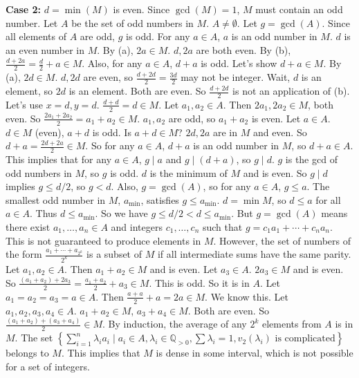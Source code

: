 \documentclass[12pt,a4paper]{article}
\theoremstyle{definition}
\begin{document}
    \textbf{Case 2:} $d = \min(M)$ is even.
    Since $\gcd(M)=1$, $M$ must contain an odd number. Let $A$ be the set of odd numbers in $M$. $A \neq \emptyset$.
    Let $g = \gcd(A)$. Since all elements of $A$ are odd, $g$ is odd.
    For any $a \in A$, $a$ is an odd number in $M$. $d$ is an even number in $M$.
    By (a), $2a \in M$. $d, 2a$ are both even.
    By (b), $\frac{d+2a}{2} = \frac{d}{2}+a \in M$.
    Also, for any $a \in A$, $d+a$ is odd. Let's show $d+a \in M$.
    By (a), $2d \in M$. $d, 2d$ are even, so $\frac{d+2d}{2} = \frac{3d}{2}$ may not be integer.
    Wait, $d$ is an element, so $2d$ is an element. Both are even. So $\frac{d+2d}{2}$ is not an application of (b).
    Let's use $x=d, y=d$. $\frac{d+d}{2}=d \in M$.
    Let $a_1, a_2 \in A$. Then $2a_1, 2a_2 \in M$, both even. So $\frac{2a_1+2a_2}{2}=a_1+a_2 \in M$.
    $a_1, a_2$ are odd, so $a_1+a_2$ is even.
    Let $a \in A$. $d \in M$ (even), $a+d$ is odd. Is $a+d \in M$?
    $2d, 2a$ are in $M$ and even. So $d+a = \frac{2d+2a}{2} \in M$.
    So for any $a \in A$, $d+a$ is an odd number in $M$, so $d+a \in A$.
    This implies that for any $a \in A$, $g \mid a$ and $g \mid (d+a)$, so $g \mid d$.
    $g$ is the gcd of odd numbers in $M$, so $g$ is odd. $d$ is the minimum of $M$ and is even.
    So $g \mid d$ implies $g \leq d/2$, so $g < d$.
    Also, $g=\gcd(A)$, so for any $a \in A$, $g \leq a$. The smallest odd number in $M$, $a_{\min}$, satisfies $g \leq a_{\min}$.
    $d=\min M$, so $d \leq a$ for all $a \in A$. Thus $d \leq a_{\min}$.
    So we have $g \leq d/2 < d \leq a_{\min}$.
    But $g=\gcd(A)$ means there exist $a_1, \ldots, a_n \in A$ and integers $c_1, \ldots, c_n$ such that $g = c_1 a_1 + \cdots + c_n a_n$. This is not guaranteed to produce elements in $M$.
    However, the set of numbers of the form $\frac{a_1+\cdots+a_{2^k}}{2^k}$ is a subset of $M$ if all intermediate sums have the same parity.
    Let $a_1, a_2 \in A$. Then $a_1+a_2 \in M$ and is even.
    Let $a_3 \in A$. $2a_3 \in M$ and is even.
    So $\frac{(a_1+a_2)+2a_3}{2} = \frac{a_1+a_2}{2}+a_3 \in M$. This is odd. So it is in $A$.
    Let $a_1=a_2=a_3=a \in A$. Then $\frac{a+a}{2}+a=2a \in M$. We know this.
    Let $a_1, a_2, a_3, a_4 \in A$. $a_1+a_2 \in M$, $a_3+a_4 \in M$. Both are even.
    So $\frac{(a_1+a_2)+(a_3+a_4)}{2} \in M$.
    By induction, the average of any $2^k$ elements from $A$ is in $M$.
    The set $\left\{ \sum_{i=1}^{n} \lambda_i a_i \mid a_i \in A, \lambda_i \in \mathbb{Q}_{>0}, \sum \lambda_i=1, v_2(\lambda_i) \text{ is complicated}\right\}$ belongs to $M$.
    This implies that $M$ is dense in some interval, which is not possible for a set of integers.
\end{document}
